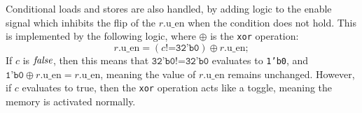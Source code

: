 \newcommand\nonblockasgn{\mathrel{\texttt{<=}}}
\newcommand\blockasgn{\mathrel{\texttt{=}}}
\newcommand\msemi{\texttt{;}\ }
\newcommand\mternary[3]{#1\mathbin{\texttt{?}}#2\mathbin{\texttt{:}}#3}
\newcommand\mxor{\oplus}
\newcommand\verilogneq{\mathbin{\texttt{!=}}}

Conditional loads and stores are also handled, by adding logic to the enable
signal which inhibits the flip of the $r.\mathrm{u\_en}$ when the condition does
not hold.  This is implemented by the following logic, where $\mxor$ is the
\texttt{xor} operation:
%
\begin{equation}
  r.\mathrm{u\_en} \blockasgn
    (c \verilogneq \texttt{32'b0})\mxor r.\mathrm{u\_en}\msemi
\end{equation}
%
If $c$ is $\mathit{false}$, then this means that
$\texttt{32'b0} \verilogneq \texttt{32'b0}$ evaluates to \texttt{1'b0}, and
$\texttt{1'b0} \mxor r.\mathrm{u\_en} = r.\mathrm{u\_en}$, meaning the value of
$r.\mathrm{u\_en}$ remains unchanged.  However, if $c$ evaluates to true, then
the \texttt{xor} operation acts like a toggle, meaning the memory is activated
normally.


